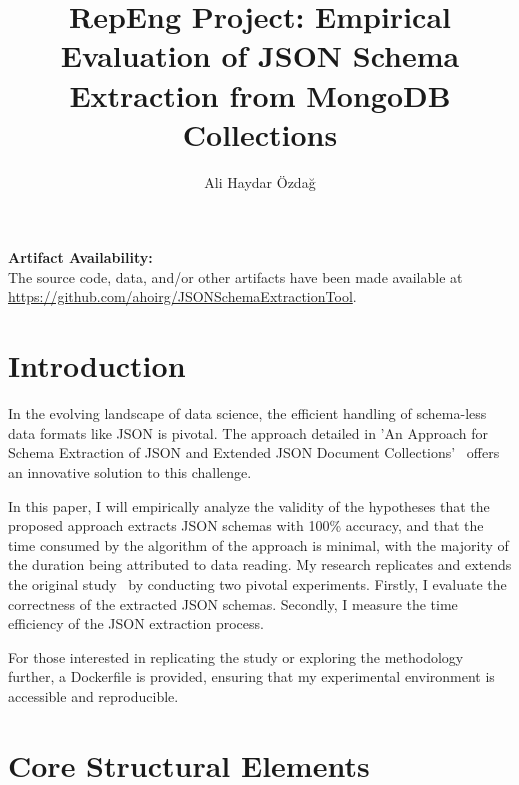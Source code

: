 \documentclass[sigconf, nonacm]{acmart}
\begin{document}
\title{RepEng Project:  Empirical Evaluation of JSON Schema Extraction from MongoDB Collections}


\author{Ali Haydar Özdağ}


\maketitle

\vspace{.3cm}
\begingroup\small\noindent\raggedright\textbf{Artifact Availability:}\\
The source code, data, and/or other artifacts have been made available at \url{https://github.com/ahoirg/JSONSchemaExtractionTool}.
\endgroup


\section{Introduction}

In the evolving landscape of data science, the efficient handling of schema-less data formats like JSON is pivotal. The approach detailed in 'An Approach for Schema Extraction of JSON and Extended JSON Document Collections'~\cite{SchemaExtraction} offers an innovative solution to this challenge.

In this paper, I will empirically analyze the validity of the hypotheses that the proposed approach extracts JSON schemas with 100\% accuracy, and that the time consumed by the algorithm of the approach is minimal, with the majority of the duration being attributed to data reading. My research replicates and extends the original study~\cite{SchemaExtraction} by conducting two pivotal experiments. Firstly, I evaluate the correctness of the extracted JSON schemas. Secondly, I measure the time efficiency of the JSON extraction process. 

For those interested in replicating the study or exploring the methodology further, a Dockerfile is provided, ensuring that my experimental environment is accessible and reproducible.

\section{Core Structural Elements}
\end{document}
